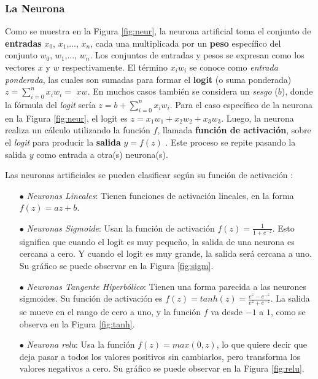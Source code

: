 \subsubsection{La Neurona}

Como se muestra en la Figura \ref{fig:neur}, la neurona artificial toma el conjunto de \textbf{entradas} $x_0$, $x_1$,..., $x_n$, cada una multiplicada por un \textbf{peso} específico del conjunto $w_0$, $w_1$,..., $w_n$. Los conjuntos de entradas y pesos se expresan como los vectores \textbf{$x$} y \textbf{$w$} respectivamente. El término $x_i w_i$ se conoce como \textit{entrada ponderada}, las cuales son sumadas para formar el \textbf{logit} (o suma ponderada) $z = \sum_{i=0}^n {x_i w_i} = $ \textbf{$x w$}. En muchos casos también se considera un \textit{sesgo} ($b$), donde la fórmula del \emph{logit} sería $z = b + \sum_{i=0}^n {x_i w_i}$. Para el caso específico de la neurona en la Figura \ref{fig:neur}, el logit es $z = x_1 w_1 + x_2 w_2 + x_3 w_3$. Luego, la neurona realiza un cálculo utilizando la función $f$, llamada \textbf{función de activación}, sobre el \emph{logit} para producir la \textbf{salida} $y = f(z)$ \cite{Bishop}. Este proceso se repite pasando la salida $y$ como entrada a otra(s) neurona(s).

Las neuronas artificiales se pueden clasificar según su función de activación \cite{Buduma}:
\begin{itemize}
    \item[$\bullet$] \textit{Neuronas Lineales}: Tienen funciones de activación lineales, en la forma $f(z) = az + b$.  
    \item[$\bullet$] \textit{Neuronas Sigmoide}: Usan la función de activación $f(z)=\displaystyle\frac{1}{1+e^{-z}}$. Esto significa que cuando el logit es muy pequeño, la salida de una neurona es cercana a cero. Y cuando el logit es muy grande, la salida será cercana a uno. Su gráfico se puede observar en la Figura \ref{fig:sigm}.
    \item[$\bullet$] \textit{Neuronas Tangente Hiperbólico}: Tienen una forma parecida a las neurones sigmoides. Su función de activación es $f(z)=tanh(z)=\displaystyle\frac{e^{z}-e^{-z}}{e^{z}+e^{-z}}$. La salida se mueve en el rango de cero a uno, y la función $f$ va desde $-1$ a $1$, como se observa en la Figura \ref{fig:tanh}.
    \item[$\bullet$] \textit{Neurona \acrshort{relu}}: Usa la función $f(z)=max(0,z)$, lo que quiere decir que deja pasar a todos los valores positivos sin cambiarlos, pero transforma los valores negativos a cero. Su gráfico se puede observar en la Figura \ref{fig:relu}.  
\end{itemize}

